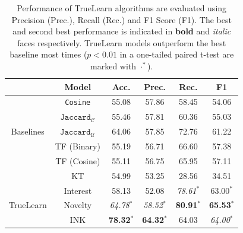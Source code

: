 \documentclass[letterpaper]{article} %
\begin{document}
\begin{table}[] \small
\caption{Performance of TrueLearn algorithms are evaluated using Precision (Prec.), Recall (Rec.) and F1 Score (F1). The best and second best performance is indicated in \textbf{bold} and \emph{italic} faces respectively. TrueLearn models outperform the best baseline most times ($p< 0.01$ in a one-tailed paired t-test are marked with $\cdot^{*}$).}
\label{tab:results}
\begin{tabular}{cccccc}
\hline
& Model              & Acc. & Prec. & Rec. & F1    \\
\hline
&\texttt{Cosine}& {55.08} & {57.86} & 58.45 & 54.06 \\
&$\texttt{Jaccard}_{\mathcal{C}}$& 55.46 & 57.81 & 60.36 & 55.03 \\
Baselines&$\texttt{Jaccard}_{\mathcal{U}}$ & 64.06 & 57.85 & {72.76} & {61.22} \\
&TF (Binary)	& 55.19 &	56.71 & 66.60 &	57.38 \\
&TF (Cosine) & 55.11 &	56.75	& 65.95	 & 57.11 \\ 
&KT & 54.99 & 53.25 & 28.56 & 34.51 \\
\hline
&Interest & 58.13    & 52.08     & \textit{78.61}$^{*}$  & 63.00$^{*}$ \\ 
TrueLearn & Novelty  & \textit{64.78}$^{*}$	  & \textit{58.52}$^{*}$  & \textbf{80.91}$^{*}$  & \textbf{65.53}$^{*}$ \\
&INK  & \textbf{78.32}$^{*}$	  & \textbf{64.32}$^{*}$	  & {64.03}  & \textit{64.00}$^{*}$ \\
\hline
\end{tabular}
\end{table}



\end{document}
